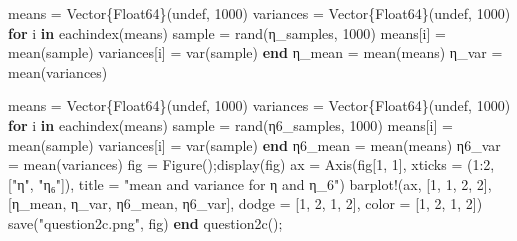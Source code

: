 \documentclass[
]{article}
\newenvironment{Shaded}{\begin{snugshade}}{\end{snugshade}}
\newcommand{\ConstantTok}[1]{\textcolor[rgb]{0.56,0.35,0.01}{#1}}
\newcommand{\ControlFlowTok}[1]{\textcolor[rgb]{0.00,0.23,0.31}{\textbf{#1}}}
\newcommand{\DataTypeTok}[1]{\textcolor[rgb]{0.68,0.00,0.00}{#1}}
\newcommand{\FloatTok}[1]{\textcolor[rgb]{0.68,0.00,0.00}{#1}}
\newcommand{\FunctionTok}[1]{\textcolor[rgb]{0.28,0.35,0.67}{#1}}
\newcommand{\KeywordTok}[1]{\textcolor[rgb]{0.00,0.23,0.31}{\textbf{#1}}}
\newcommand{\NormalTok}[1]{\textcolor[rgb]{0.00,0.23,0.31}{#1}}
\newcommand{\OperatorTok}[1]{\textcolor[rgb]{0.37,0.37,0.37}{#1}}
\newcommand{\StringTok}[1]{\textcolor[rgb]{0.13,0.47,0.30}{#1}}
\begin{document}
\begin{Shaded}
\begin{Highlighting}[]
\NormalTok{    means }\OperatorTok{=} \FunctionTok{Vector}\DataTypeTok{\{Float64\}}\NormalTok{(}\ConstantTok{undef}\NormalTok{, }\FloatTok{1000}\NormalTok{)}
\NormalTok{    variances }\OperatorTok{=} \FunctionTok{Vector}\DataTypeTok{\{Float64\}}\NormalTok{(}\ConstantTok{undef}\NormalTok{, }\FloatTok{1000}\NormalTok{)}
    \ControlFlowTok{for}\NormalTok{ i }\KeywordTok{in} \FunctionTok{eachindex}\NormalTok{(means)}
\NormalTok{        sample }\OperatorTok{=} \FunctionTok{rand}\NormalTok{(η\_samples, }\FloatTok{1000}\NormalTok{)}
\NormalTok{        means[i] }\OperatorTok{=} \FunctionTok{mean}\NormalTok{(sample)}
\NormalTok{        variances[i] }\OperatorTok{=} \FunctionTok{var}\NormalTok{(sample)}
    \ControlFlowTok{end}
\NormalTok{    η\_mean }\OperatorTok{=} \FunctionTok{mean}\NormalTok{(means)}
\NormalTok{    η\_var }\OperatorTok{=} \FunctionTok{mean}\NormalTok{(variances)}

\NormalTok{    means }\OperatorTok{=} \FunctionTok{Vector}\DataTypeTok{\{Float64\}}\NormalTok{(}\ConstantTok{undef}\NormalTok{, }\FloatTok{1000}\NormalTok{)}
\NormalTok{    variances }\OperatorTok{=} \FunctionTok{Vector}\DataTypeTok{\{Float64\}}\NormalTok{(}\ConstantTok{undef}\NormalTok{, }\FloatTok{1000}\NormalTok{)}
    \ControlFlowTok{for}\NormalTok{ i }\KeywordTok{in} \FunctionTok{eachindex}\NormalTok{(means)}
\NormalTok{        sample }\OperatorTok{=} \FunctionTok{rand}\NormalTok{(η}\FloatTok{6}\NormalTok{\_samples, }\FloatTok{1000}\NormalTok{)}
\NormalTok{        means[i] }\OperatorTok{=} \FunctionTok{mean}\NormalTok{(sample)}
\NormalTok{        variances[i] }\OperatorTok{=} \FunctionTok{var}\NormalTok{(sample)}
    \ControlFlowTok{end}
\NormalTok{    η}\FloatTok{6}\NormalTok{\_mean }\OperatorTok{=} \FunctionTok{mean}\NormalTok{(means)}
\NormalTok{    η}\FloatTok{6}\NormalTok{\_var }\OperatorTok{=} \FunctionTok{mean}\NormalTok{(variances)}
\NormalTok{    fig }\OperatorTok{=} \FunctionTok{Figure}\NormalTok{();}\FunctionTok{display}\NormalTok{(fig)}
\NormalTok{    ax }\OperatorTok{=} \FunctionTok{Axis}\NormalTok{(fig[}\FloatTok{1}\NormalTok{, }\FloatTok{1}\NormalTok{],}
\NormalTok{        xticks }\OperatorTok{=}\NormalTok{ (}\FloatTok{1}\OperatorTok{:}\FloatTok{2}\NormalTok{, [}\StringTok{"η"}\NormalTok{, }\StringTok{"η₆"}\NormalTok{]),}
\NormalTok{    title }\OperatorTok{=} \StringTok{"mean and variance for η and η\_6"}\NormalTok{)}
    \FunctionTok{barplot!}\NormalTok{(ax, [}\FloatTok{1}\NormalTok{, }\FloatTok{1}\NormalTok{, }\FloatTok{2}\NormalTok{, }\FloatTok{2}\NormalTok{], [η\_mean, η\_var, η}\FloatTok{6}\NormalTok{\_mean, η}\FloatTok{6}\NormalTok{\_var],}
\NormalTok{        dodge }\OperatorTok{=}\NormalTok{ [}\FloatTok{1}\NormalTok{, }\FloatTok{2}\NormalTok{, }\FloatTok{1}\NormalTok{, }\FloatTok{2}\NormalTok{],}
\NormalTok{        color }\OperatorTok{=}\NormalTok{ [}\FloatTok{1}\NormalTok{, }\FloatTok{2}\NormalTok{, }\FloatTok{1}\NormalTok{, }\FloatTok{2}\NormalTok{])}
    \FunctionTok{save}\NormalTok{(}\StringTok{"question2c.png"}\NormalTok{, fig)}
\KeywordTok{end}
\FunctionTok{question2c}\NormalTok{();}
\end{Highlighting}
\end{Shaded}
\end{document}
